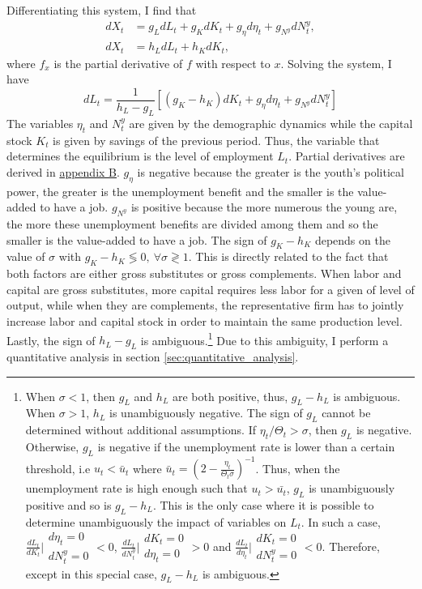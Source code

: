 Differentiating this system, I find that
	\begin{align*}
		dX_t &= g_L dL_t + g_K dK_t + g_\eta d\eta_t + g_{N^y} dN_t^y, \\
		dX_t &= h_L dL_t + h_K dK_t,
	\end{align*}
where $f_x$ is the partial derivative of $f$ with respect to $x$. Solving the system, I have
	\begin{equation*}
		dL_t = \frac{1}{h_L-g_L}\left[(g_K-h_K) dK_t + g_\eta d\eta_t + g_{N^y} dN_t^y \right]
	\end{equation*}
The variables $\eta_t$ and $N_t^y$ are given by the demographic dynamics while the capital stock $K_t$ is given by savings of the previous period. Thus, the variable that determines the equilibrium is the level of employment $L_t$. Partial derivatives are derived in \hyperref[appendix:derivatives]{appendix B}. 
$g_\eta$ is negative because the greater is the youth's political power, the greater is the unemployment benefit and the smaller is the value-added to have a job. $g_{N^y}$ is positive because the more numerous the young are, the more these unemployment benefits are divided among them and so the smaller is the value-added to have a job. The sign of $g_K-h_K$ depends on the value of $\sigma$ with $g_K-h_K \lessgtr 0, ~ \forall \sigma \gtrless 1$. This is directly related to the fact that both factors are either gross substitutes or gross complements. When labor and capital are gross substitutes, more capital requires less labor for a given of level of output, while when they are complements, the representative firm has to jointly increase labor and capital stock in order to maintain the same production level. Lastly, the sign of $h_L-g_L$ is ambiguous.\footnote{When $\sigma < 1$, then $g_L$ and $h_L$ are both positive, thus, $g_L-h_L$ is ambiguous. When $\sigma > 1$, $h_L$ is unambiguously negative. The sign of $g_L$ cannot be determined without additional assumptions. If $\eta_t/\Theta_t > \sigma$, then $g_L$ is negative. Otherwise, $g_L$ is negative if the unemployment rate is lower than a certain threshold, i.e $u_t < \bar{u}_t$ where $\bar{u}_t = \left(2 - \frac{\eta_t}{\Theta_t\sigma}\right)^{-1}$. Thus, when the unemployment rate is high enough such that $u_t > \bar{u_t}$, $g_L$ is unambiguously positive and so is $g_L-h_L$. This is the only case where it is possible to determine unambiguously the impact of variables on $L_t$. In such a case, $\frac{dL_t}{dK_t}\Bigr|{\substack{d\eta_t = 0\\dN_t^y = 0}} < 0$, $\frac{dL_t}{dN^y_t}\Bigr|{\substack{dK_t = 0\\d\eta_t = 0}} > 0$ and $\frac{dL_t}{d\eta_t}\Bigr|{\substack{dK_t = 0\\dN_t^y = 0}} < 0$. Therefore, except in this special case, $g_L-h_L$ is ambiguous.} Due to this ambiguity, I perform a quantitative analysis in section \ref{sec:quantitative_analysis}.